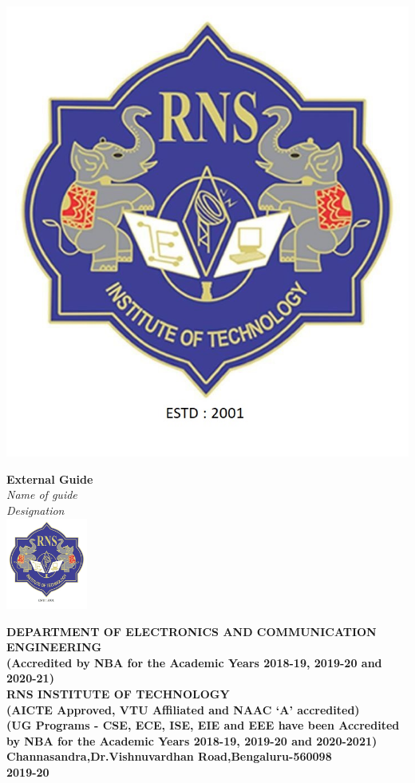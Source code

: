 \begin{titlingpage}
\begin{minipage}[t]{0.6\textwidth}
	\includegraphics[height=3 cm]{images/rns1.jpg}
\end{minipage}\hspace{0.06cm}
\begin{minipage}[t]{0.3\textwidth}%
	\Large\textbf{External Guide}\\
	\large\textit{\color{blue}Name of guide}\\
	\large\textit{\color{blue}Designation}\\
	
	\centering\includegraphics[height=3cm]{images/rns1.jpg}\\
\end{minipage}



\begin{center}
\vspace{0.5cm}
\scriptsize\textbf{\color{blue}DEPARTMENT OF ELECTRONICS AND COMMUNICATION ENGINEERING\\
\small(Accredited by NBA for the Academic Years 2018-19, 2019-20 and 2020-21)}\\
\vspace{0.5cm}
\small\textbf{\color{blue}RNS INSTITUTE OF TECHNOLOGY\\
(AICTE Approved, VTU Affiliated and NAAC `A' accredited)\\
(UG Programs - CSE, ECE, ISE, EIE and EEE have been Accredited by NBA for the Academic Years 2018-19, 2019-20 and 2020-2021)\\
Channasandra,Dr.Vishnuvardhan Road,Bengaluru-560098\\
\vspace{0.5cm}
2019-20}
\end{center}
\end{titlingpage}
